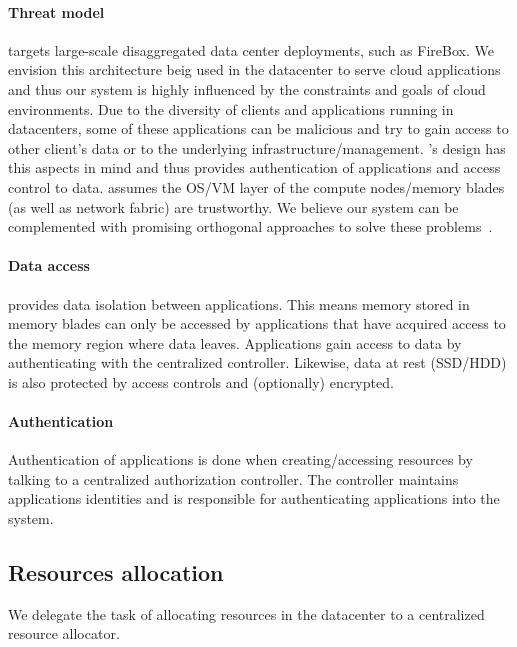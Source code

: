 \paragraph{Threat model} \System targets large-scale disaggregated data center deployments, such as FireBox. We envision this architecture beig used in the datacenter to serve cloud applications and thus our system is highly influenced by the constraints and goals of cloud environments. Due to the diversity of clients and applications running in datacenters, some of these applications can be malicious and try to gain access to other client's data or to the underlying infrastructure/management. \System's design has this aspects in mind and thus provides authentication of applications and access control to data. \System assumes the OS/VM layer of the compute nodes/memory blades (as well as network fabric) are trustworthy. We believe our system can be complemented with promising orthogonal approaches to solve these problems~\cite{intel_sgx}.

\paragraph{Data access} \System provides data isolation between applications. This means memory stored in memory blades can only be accessed by applications that have acquired access to the memory region where data leaves. Applications gain access to data by authenticating with the centralized controller. Likewise, data at rest (SSD/HDD) is also protected by access controls and (optionally) encrypted.

\paragraph{Authentication} Authentication of applications is done when creating/accessing resources by talking to a centralized authorization controller. The controller maintains applications identities and is responsible for authenticating applications into the system.


\subsection{Resources allocation}

We delegate the task of allocating resources in the datacenter to a centralized resource allocator.

